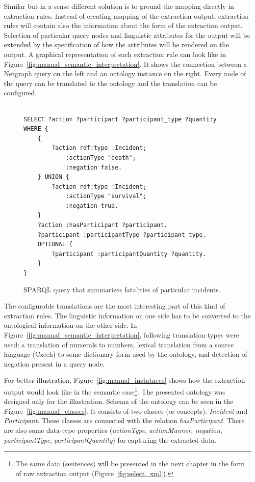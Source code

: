 Similar but in a sense different solution is to ground the mapping directly in extraction rules. Instead of creating mapping of the extraction output, extraction rules will contain also the information about the form of the extraction output. Selection of particular query nodes and linguistic attributes for the output will be extended by the specification of how the attributes will be rendered on the output. A graphical representation of such extraction rule can look like in Figure~\ref{fig:manual_semantic_interpretation}. It shows the connection between a Netgraph query on the left and an ontology instance on the right. Every node of the query can be translated to the ontology and the translation can be configured. 


\begin{figure}[b!]
\begin{verbatim}

SELECT ?action ?participant ?participant_type ?quantity
WHERE {
	{
		?action rdf:type :Incident;
			:actionType "death";
			:negation false.
	} UNION {
		?action rdf:type :Incident;
			:actionType "survival";
			:negation true.
	}
	?action :hasParticipant ?participant.
	?participant :participantType ?participant_type.
	OPTIONAL {
		?participant :participantQuantity ?quantity.
	}
}
\end{verbatim}
\caption{SPARQL query that summarizes fatalities of particular incidents.}
\label{fig:sparql_aggregation}
\end{figure}


The configurable translations are the most interesting part of this kind of extraction rules. The linguistic information on one side has to be converted to the ontological information on the other side. In Figure~\ref{fig:manual_semantic_interpretation}, following translation types were used: a translation of numerals to numbers, lexical translation from a source language (Czech) to some dictionary form used by the ontology, and detection of negation present in a query node.

For better illustration, Figure~\ref{fig:manual_instatnces} shows how the extraction output would look like in the semantic case\footnote{The same data (sentences) will be presented in the next chapter in the form of raw extraction output (Figure~\ref{fig:select_xml}).}. The presented ontology was designed only for the illustration. Schema of the ontology can be seen in the Figure~\ref{fig:manual_classes}. It consists of two classes (or concepts): \emph{Incident} and \emph{Participant}. These classes are connected with the relation \emph{hasParticipant}. There are also some data-type properties (\emph{actionType}, \emph{actionManner}, \emph{negation}, \emph{participantType}, \emph{participantQuantity}) for capturing the extracted data. 

